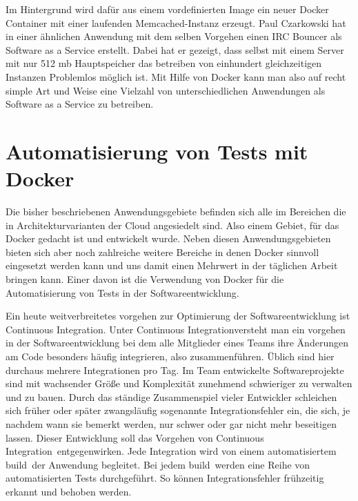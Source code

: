 Im Hintergrund wird dafür aus einem vordefinierten Image ein neuer Docker Container mit einer laufenden Memcached-Instanz erzeugt.
Paul Czarkowski hat in einer ähnlichen Anwendung mit dem selben Vorgehen einen  IRC Bouncer als Software as a Service erstellt. Dabei hat er gezeigt, dass selbst mit einem Server mit nur 512 mb Hauptspeicher das betreiben von einhundert gleichzeitigen Instanzen Problemlos möglich ist. \cite{czarkowski_i_????}
Mit Hilfe von Docker kann man also auf recht simple Art und Weise eine Vielzahl von unterschiedlichen Anwendungen als Software as a Service zu betreiben.

\section{Automatisierung von Tests mit Docker}
\label{sec:automatisierung_von_tests_mit_docker}

Die bisher beschriebenen Anwendungsgebiete befinden sich alle im Bereichen die in Architekturvarianten der Cloud angesiedelt sind. Also einem Gebiet, für das Docker gedacht ist und entwickelt wurde. Neben diesen Anwendungsgebieten bieten sich aber noch zahlreiche weitere Bereiche in denen Docker sinnvoll eingesetzt werden kann und uns damit einen Mehrwert in der täglichen Arbeit bringen kann.
Einer davon ist die Verwendung von Docker für die Automatisierung von Tests in der Softwareentwicklung.

Ein heute weitverbreitetes vorgehen zur Optimierung der Softwareentwicklung ist \grq Continuous Integration\grq . Unter \grq Continuous Integration\grq versteht man ein vorgehen in der Softwareentwicklung bei dem alle Mitglieder eines Teams ihre Änderungen am Code besonders häufig integrieren, also zusammenführen. Üblich sind hier durchaus mehrere Integrationen pro Tag. 
\glqq Im Team entwickelte Softwareprojekte sind mit wachsender Größe und Komplexität zunehmend schwieriger zu verwalten und zu bauen. Durch das ständige Zusammenspiel vieler Entwickler schleichen sich früher oder später zwangsläufig sogenannte Integrationsfehler ein, die sich, je nachdem wann sie bemerkt werden, nur schwer oder gar nicht mehr beseitigen lassen.\grqq \cite{feustel_continuous_????}
Dieser Entwicklung soll das Vorgehen von \grq Continuous Integration\grq\ entgegenwirken.
Jede Integration wird von einem automatisiertem \grq build\grq\ der Anwendung begleitet. Bei jedem \grq build\grq\ werden eine Reihe von automatisierten Tests durchgeführt. So können Integrationsfehler frühzeitig erkannt und behoben werden.

